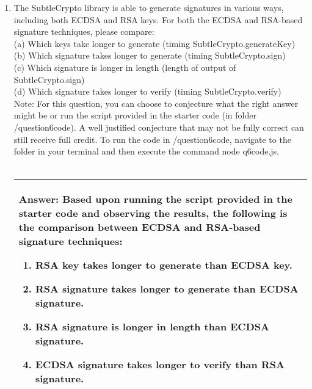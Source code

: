 \documentclass[11pt]{article}
\newenvironment{answer}
{\vspace{2mm}\begin{tabular}{|p{0.9\textwidth}|}
 \hline{\bf Answer:} }{\\ \hline\end{tabular}\vspace{1cm}}
\newenvironment{problems}
{\begin{enumerate}[label=\bfseries Question \arabic*.,align=left,leftmargin=1em,labelwidth=1.5em]}
{\end{enumerate}}
\begin{document}
\begin{problems}
\begin{answer}
\end{answer}
\item The SubtleCrypto library is able to generate signatures in various ways, including both ECDSA and RSA keys. For both the ECDSA and RSA-based signature techniques, please compare:
\\ (a) Which keys take longer to generate (timing SubtleCrypto.generateKey) 
\\(b) Which signature takes longer to generate (timing SubtleCrypto.sign)
\\ (c) Which signature is longer in length (length of output of SubtleCrypto.sign)
\\(d) Which signature takes longer to verify (timing SubtleCrypto.verify)
\\
Note: For this question, you can choose to conjecture what the right answer might be or run the script provided in the starter code (in folder /question6code). A well justified conjecture that may not be fully correct can still receive full credit. To run the code in /question6code, navigate to the folder in your terminal and then execute the command node q6code.js.
\\ \\
\begin{answer}
Based upon running the script provided in the starter code and observing the results, the following is the comparison between ECDSA and RSA-based signature techniques:
\begin{enumerate}
    \item RSA key takes longer to generate than ECDSA key.
    \item RSA signature takes longer to generate than ECDSA signature.
    \item RSA signature is longer in length than ECDSA signature.
    \item ECDSA signature takes longer to verify than RSA signature.
\end{enumerate}

\end{answer}
\end{problems}
\end{document}
